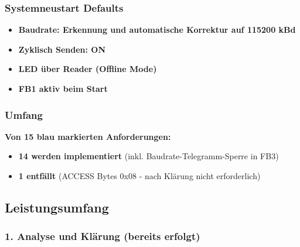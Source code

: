 \documentclass[a4paper,11pt]{article}
\providecommand{\tightlist}{\setlength{\itemsep}{0pt}\setlength{\parskip}{0pt}}
\begin{document}
\hypertarget{systemneustart-defaults}{%
\subsubsection{Systemneustart Defaults}\label{systemneustart-defaults}}

\begin{itemize}
\tightlist
\item
  \textbf{Baudrate: Erkennung und automatische Korrektur auf 115200 kBd}
\item
  \textbf{Zyklisch Senden: ON}
\item
  \textbf{LED über Reader (Offline Mode)}
\item
  \textbf{FB1 aktiv beim Start}
\end{itemize}

\hypertarget{umfang}{%
\subsubsection{Umfang}\label{umfang}}

\textbf{Von 15 blau markierten Anforderungen:}

\begin{itemize}
\tightlist
\item
  \textbf{14 werden implementiert} (inkl. Baudrate-Telegramm-Sperre in
  FB3)
\item
  \textbf{1 entfällt} (ACCESS Bytes 0x08 - nach Klärung nicht
  erforderlich)
\end{itemize}

\hypertarget{leistungsumfang}{%
\subsection{Leistungsumfang}\label{leistungsumfang}}

\hypertarget{analyse-und-kluxe4rung-bereits-erfolgt}{%
\subsubsection{1. Analyse und Klärung (bereits
erfolgt)}\label{analyse-und-kluxe4rung-bereits-erfolgt}}
\end{document}
